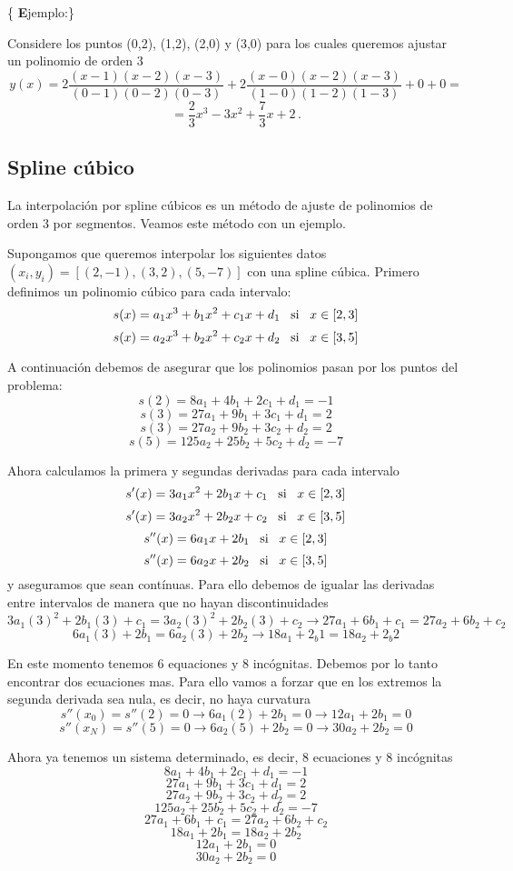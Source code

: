 \documentclass[
]{agujournal2019}
\begin{document}
\{ \textbf Ejemplo:\}

Considere los puntos (0,2), (1,2), (2,0) y (3,0) para los cuales
queremos ajustar un polinomio de orden 3
\[y(x)=2\frac{(x-1)(x-2)(x-3)}{(0-1)(0-2)(0-3)} + 2\frac{(x-0)(x-2)(x-3)}{(1-0)(1-2)(1-3)} + 0
+ 0=\] \[=\frac{2}{3}x^3 -3x^2 +\frac{7}{3}x +2\,.\]

\hypertarget{spline-cuxfabico}{%
\subsection{Spline cúbico}\label{spline-cuxfabico}}

La interpolación por spline cúbicos es un método de ajuste de polinomios
de orden 3 por segmentos. Veamos este método con un ejemplo.

Supongamos que queremos interpolar los siguientes datos
\((x_i,y_i)=[(2,-1), (3,2), (5,-7)]\) con una spline cúbica. Primero
definimos un polinomio cúbico para cada intervalo:
\[s(x)=a_1x^3 + b_1 x^2 +c_1x +d_1\,\,\,\,\,{\rm si}\,\,\,\,\,x\in[2,3]\]
\[s(x)=a_2x^3 + b_2 x^2 +c_2x +d_2\,\,\,\,\,{\rm si}\,\,\,\,\,x\in[3,5]\]

A continuación debemos de asegurar que los polinomios pasan por los
puntos del problema: \[s(2)=8a_1 + 4b_1  +2c_1 +d_1=-1\]
\[s(3)=27a_1 + 9b_1  +3c_1 +d_1=2\] \[s(3)=27a_2 + 9b_2  +3c_2 +d_2=2\]
\[s(5)=125a_2 + 25b_2  +5c_2 +d_2=-7\]

Ahora calculamos la primera y segundas derivadas para cada intervalo
\[s'(x)=3a_1x^2+2b_1x+c_1\,\,\,\,\,{\rm si}\,\,\,\,\,x\in[2,3]\]
\[s'(x)=3a_2x^2+2b_2x+c_2\,\,\,\,\,{\rm si}\,\,\,\,\,x\in[3,5]\]
\[s''(x)=6a_1x+2b_1\,\,\,\,\,{\rm si}\,\,\,\,\,x\in[2,3]\]
\[s''(x)=6a_2x+2b_2\,\,\,\,\,{\rm si}\,\,\,\,\,x\in[3,5]\] y aseguramos
que sean contínuas. Para ello debemos de igualar las derivadas entre
intervalos de manera que no hayan discontinuidades
\[3a_1(3)^2+2b_1(3)+c_1=3a_2(3)^2+2b_2(3)+c_2\rightarrow 27a_1+6b_1+c_1=27a_2+6b_2+c_2\]
\[6a_1(3)+2b_1=6a_2(3)+2b_2\rightarrow 18a_1+2_b1=18a_2+2_b2\]

En este momento tenemos 6 equaciones y 8 incógnitas. Debemos por lo
tanto encontrar dos ecuaciones mas. Para ello vamos a forzar que en los
extremos la segunda derivada sea nula, es decir, no haya curvatura
\[s''(x_0)=s''(2)=0\rightarrow 6a_1(2)+2b_1=0 \rightarrow 12a_1 + 2b_1=0\]
\[s''(x_N)=s''(5)=0\rightarrow 6a_2(5)+2b_2=0 \rightarrow 30a_2+2b_2=0\]

Ahora ya tenemos un sistema determinado, es decir, 8 ecuaciones y 8
incógnitas \[8a_1 + 4b_1  +2c_1 +d_1=-1\] \[27a_1 + 9b_1  +3c_1 +d_1=2\]
\[27a_2 + 9b_2  +3c_2 +d_2=2\] \[125a_2 + 25b_2  +5c_2 +d_2=-7\]
\[27a_1+6b_1+c_1=27a_2+6b_2+c_2\] \[18a_1+2b_1=18a_2+2b_2\]
\[12a_1 + 2b_1=0\] \[30a_2+2b_2=0\]
\end{document}
